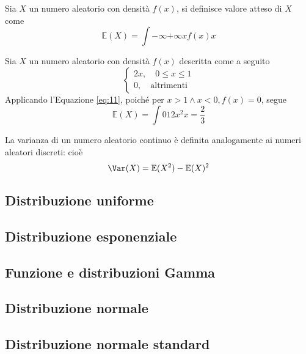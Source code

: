 \documentclass{subfiles}
\begin{document}
\begin{Definition*}
    Sia \(X\) un numero aleatorio con densità \(f(x)\), si definisce valore atteso di \(X\) come
    \begin{equation}
        \mathbb{E}(X) = \int{-\infty}{+\infty}{x f(x)}{x}
    \end{equation}
\end{Definition*}
\begin{Example*}
    Sia \(X\) un numero aleatorio con densità \(f(x)\) descritta come a seguito
    \[\begin{cases}
            2x,  \quad 0 \le x \le 1 \\
            0, \quad \text{altrimenti}
        \end{cases}\]
    Applicando l'Equazione \eqref{eq:11},  poiché per \(x > 1 \land x < 0, f(x) = 0\), segue
    \[
        \mathbb{E}(X) = \int{0}{1}{2x^{2}}{x} = \frac{2}{3}
    \]

    \noindent
    La varianza di un numero aleatorio continuo è definita analogamente ai numeri aleatori discreti: cioè
    \[
        \Var(X) = \mathbb{E}(X^{2}) - \mathbb{E}(X)^{2}
    \]
\end{Example*}

\subsection{Distribuzione uniforme}


\subsection{Distribuzione esponenziale}


\subsection{Funzione e distribuzioni Gamma}


\subsection{Distribuzione normale}


\subsection{Distribuzione normale standard}

\end{document}

